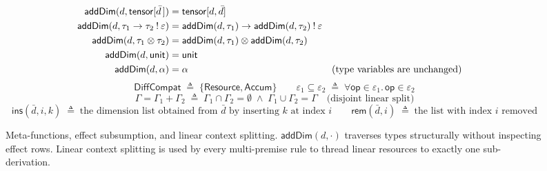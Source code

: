
\providecommand{\DiffCompat}{\mathsf{DiffCompat}}
\providecommand{\addDim}[2]{\mathsf{addDim}(#1, #2)}
\providecommand{\hastypeout}[6]{#1; #2 \vdash #3 : #4 \mathbin{!} #5 \dashv #6}

\begin{figure}[t]
\small
\begin{align*}
\addDim{d}{\tensor{\bar{d}\,}} &= \tensor{d, \bar{d}} \\
\addDim{d}{\tau_1 \to \tau_2 \mathbin{!} \varepsilon} &= \addDim{d}{\tau_1} \to \addDim{d}{\tau_2} \mathbin{!} \varepsilon \\
\addDim{d}{\tau_1 \otimes \tau_2} &= \addDim{d}{\tau_1} \otimes \addDim{d}{\tau_2} \\
\addDim{d}{\mathsf{unit}} &= \mathsf{unit} \\
\addDim{d}{\alpha} &= \alpha && \text{(type variables are unchanged)}
\end{align*}
\[
\DiffCompat \;\triangleq\; \{\mathsf{Resource}, \mathsf{Accum}\}
\qquad
\varepsilon_1 \subseteq \varepsilon_2 \;\triangleq\; \forall \mathsf{op} \in \varepsilon_1.\, \mathsf{op} \in \varepsilon_2
\]
\[
\Gamma = \Gamma_1 + \Gamma_2 \;\triangleq\;
\Gamma_1 \cap \Gamma_2 = \emptyset \;\land\; \Gamma_1 \cup \Gamma_2 = \Gamma
\quad \text{(disjoint linear split)}
\]
\[
\mathsf{ins}(\bar{d}, i, k) \;\triangleq\;
\text{the dimension list obtained from $\bar{d}$ by inserting $k$ at index $i$}
\qquad
\mathsf{rem}(\bar{d}, i) \;\triangleq\; \text{the list with index $i$ removed}
\]
\caption{Meta-functions, effect subsumption, and linear context splitting.
$\addDim{d}{\cdot}$ traverses types structurally without inspecting effect rows.
Linear context splitting is used by every multi-premise rule to thread linear
resources to exactly one sub-derivation.}
\label{fig:typing-meta}
\end{figure}

